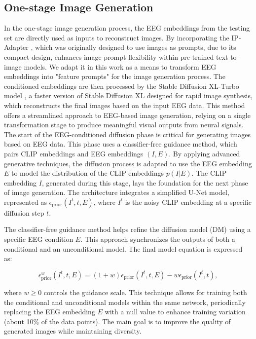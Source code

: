 \documentclass{article}
\begin{document}
\subsection{One-stage Image Generation}
In the one-stage image generation process, the EEG embeddings from the testing set are directly used as inputs to reconstruct images. By incorporating the IP-Adapter \cite{ipadaptor_2023}, which was originally designed to use images as prompts, due to its compact design, enhances image prompt flexibility within pre-trained text-to-image models. We adapt it in this work as a means to transform EEG embeddings into "feature prompts" for the image generation process.
The conditioned embeddings are then processed by the Stable Diffusion XL-Turbo model \cite{sdxl_2023, lcm_2024}, a faster version of Stable Diffusion XL designed for rapid image synthesis, which reconstructs the final images based on the input EEG data. This method offers a streamlined approach to EEG-based image generation, relying on a single transformation stage to produce meaningful visual outputs from neural signals. The start of the EEG-conditioned diffusion phase is critical for generating images based on EEG data. This phase uses a classifier-free guidance method, which pairs CLIP embeddings and EEG embeddings \((I, E)\). By applying advanced generative techniques, the diffusion process is adapted to use the EEG embedding \(E\) to model the distribution of the CLIP embeddings \(p(I|E)\). The CLIP embedding \(I\), generated during this stage, lays the foundation for the next phase of image generation. The architecture integrates a simplified U-Net model, represented as \(\epsilon_{\text{prior}}(I^t, t, E)\), where \(I^t\) is the noisy CLIP embedding at a specific diffusion step \(t\).

The classifier-free guidance method helps refine the diffusion model (DM) using a specific EEG condition \(E\). This approach synchronizes the outputs of both a conditional and an unconditional model. The final model equation is expressed as:

\begin{equation}
\epsilon_{\text{prior}}^{w}(I^t, t, E) = (1 + w)\epsilon_{\text{prior}}(I^t, t, E) - w\epsilon_{\text{prior}}(I^t, t),
\end{equation}

where \(w \geq 0\) controls the guidance scale. This technique allows for training both the conditional and unconditional models within the same network, periodically replacing the EEG embedding \(E\) with a null value to enhance training variation (about 10\% of the data points). The main goal is to improve the quality of generated images while maintaining diversity.
\end{document}
